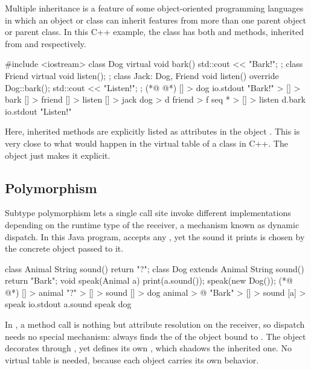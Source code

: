 Multiple inheritance is a feature of some object-oriented
  programming languages in which an object or class can inherit
  features from more than one parent object or parent class.
In this C++ example, the class  has both  and
   methods, inherited from  and  respectively.

\begin{ffcode}
#include <iostream>
class Dog {
  virtual void bark() {
    std::cout << "Bark!";
  }
};
class Friend {
  virtual void listen();
};
class Jack: Dog, Friend {
  void listen() override {
    Dog::bark();
    std::cout << "Listen!";
  }
};
(*@ \ffcolumnbreak @*)
[] > dog
  io.stdout "Bark!" > [] > bark
[] > friend
  [] > listen
[] > jack
  dog > d
  friend > f
  seq * > [] > listen
    d.bark
    io.stdout "Listen!"
\end{ffcode}

Here, inherited methods are explicitly listed as attributes
  in the object .
This is very close to what would happen in the virtual table of
  a class  in C++.
The \eolang{} object  just makes it explicit.

\subsection{Polymorphism}
\label{sec:polymorphism}

Subtype polymorphism lets a single call site invoke different
  implementations depending on the runtime type of the receiver,
  a mechanism known as dynamic dispatch.
In this Java program,  accepts any , yet the sound
  it prints is chosen by the concrete object passed to it.

\begin{ffcode}
class Animal {
  String sound() {
    return "?";
  }
}
class Dog extends Animal {
  String sound() {
    return "Bark";
  }
}
void speak(Animal a) {
  print(a.sound());
}
speak(new Dog());
(*@ \ffcolumnbreak @*)
[] > animal
  "?" > [] > sound
[] > dog
  animal > @
  "Bark" > [] > sound
[a] > speak
  io.stdout a.sound
speak dog
\end{ffcode}

In \eolang{}, a method call is nothing but attribute resolution on the
  receiver, so dispatch needs no special mechanism:  always
  finds the  of the object bound to .
The object  decorates  through , yet defines its
  own , which shadows the inherited one.
No virtual table is needed, because each object carries its own behavior.

